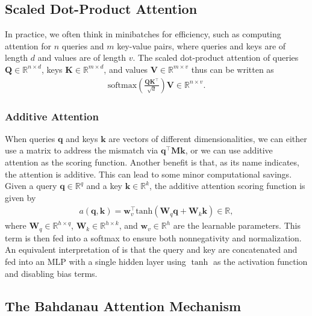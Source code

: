 \documentclass[a4paper,12pt]{article}
\theoremstyle{definition}
\begin{document}
\subsection*{Scaled Dot-Product Attention}
In practice, we often think in minibatches for efficiency, such as computing attention for $n$ queries and $m$ key-value pairs, where queries and keys are of length $d$
and values are of length $v$. The scaled dot-product attention of queries $\mathbf Q\in\mathbb R^{n\times d}$, keys $\mathbf K\in\mathbb R^{m\times d}$, 
and values $\mathbf V\in\mathbb R^{m\times v}$ thus can be written as
 \begin{equation*}
    \begin{aligned}
        \mathrm{softmax}\left(\frac{\mathbf Q \mathbf K^\top }{\sqrt{d}}\right) \mathbf V \in \mathbb{R}^{n\times v}.
    \end{aligned}
\end{equation*}
\subsubsection*{Additive Attention}
When queries $\mathbf{q}$ and keys $\mathbf{k}$ are vectors of different dimensionalities, we can either use a matrix to address the mismatch via $\mathbf{q}^\top \mathbf{M} \mathbf{k}$, 
or we can use additive attention as the scoring function. Another benefit is that, as its name indicates, the attention is additive. This can lead to some minor computational savings. 
Given a query $\mathbf{q} \in \mathbb{R}^q$ and a key $\mathbf{k} \in \mathbb{R}^k$, the additive attention scoring function is given by
\begin{equation*}
    \begin{aligned}
        a(\mathbf q, \mathbf k) = \mathbf w_v^\top \text{tanh}(\mathbf W_q\mathbf q + \mathbf W_k \mathbf k) \in \mathbb{R},
    \end{aligned}
\end{equation*}
where $\mathbf W_q\in\mathbb R^{h\times q}$, $\mathbf W_k\in\mathbb R^{h\times k}$, and $\mathbf w_v\in\mathbb R^{h}$ are the learnable parameters. 
This term is then fed into a softmax to ensure both nonnegativity and normalization. An equivalent interpretation of is that the query and key are 
concatenated and fed into an MLP with a single hidden layer using $\tanh$ as the activation function and disabling bias terms.

\subsection*{The Bahdanau Attention Mechanism}
\end{document}
